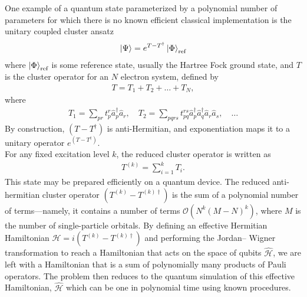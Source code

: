 \documentclass{book}
\theoremstyle{definition}
\newcommand{\had}{\mathcal{H}}
\begin{document}
One example of a quantum state parameterized by a
polynomial number of parameters for which there is no known
efficient classical implementation is the unitary coupled cluster
ansatz
\begin{align}
\ket{\Psi} = e^{T - T^\dagger}\ket{\Phi}_\text{ref}
\end{align}
where $\ket{\Phi}_\text{ref}$ is some reference state, usually the Hartree Fock ground state, and $T$ is the cluster operator for an $N$ electron system, defined by
\begin{align}
T =T_1 + T_2 + \dots + T_N,
\end{align}
where
\begin{align}
T_1 = \sum_{pr}t^r_p \hat{a}_p^\dagger\hat{a}_r, \quad T_2 = \sum_{pqrs}t^{rs}_{pq}\hat{a}_p^\dagger \hat{a}_q^\dagger\hat{a}_r \hat{a}_s,\quad \dots
\end{align}
By construction, $(T - T^\dagger)$ is anti-Hermitian, and exponentiation maps it to a unitary operator $e^{(T - T^\dagger)}$. \\

For any fixed excitation level $k$, the reduced cluster operator is written as
\begin{align}
T^{(k)} = \sum^k_{i=1}T_i.
\end{align}
This state may be prepared efficiently on a quantum
device. The reduced anti-hermitian cluster operator  $(T^{(k)} - T^{(k)\dagger})$ is the sum of a polynomial number of terms—namely, it contains
a number of terms $\mathcal{O}(N^k(M-N)^k)$, where $M$ is the number of
single-particle orbitals. By defining an effective Hermitian
Hamiltonian $\had = i(T^{(k)} - T^{(k)\dagger})$ and performing the Jordan–
Wigner transformation to reach a Hamiltonian that acts on the
space of qubits $\hat{\had}$, we are left with a Hamiltonian that is a sum of polynomially many products of Pauli operators. The problem then reduces to the quantum simulation of this effective Hamiltonian, $\hat{\had}$ which can be one in polynomial time using known procedures. 





















\newpage
\end{document}
